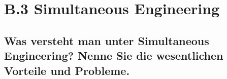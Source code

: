 \section*{B.3 Simultaneous Engineering}

\subsection{Was versteht man unter Simultaneous Engineering? Nenne Sie die wesentlichen Vorteile und Probleme.}
